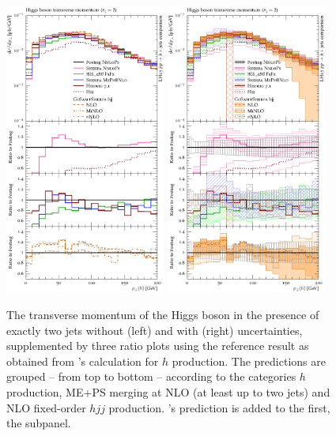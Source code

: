 \begin{figure}[t!]
  \centering
  \includegraphics[width=0.47\textwidth]{figures/hjetscomp_u_H_jj_pT_excl.pdf}
  \hfill
  \includegraphics[width=0.47\textwidth]{figures/hjetscomp_H_jj_pT_excl.pdf}
  \caption{\label{fig:hjetscomp:results:2obs:hpt_excl}%
    The transverse momentum of the Higgs boson in the presence of 
    exactly two jets without (left) and with (right) uncertainties,
    supplemented by three ratio plots using the reference result as
    obtained from \hjetscompPowheg's \hjetscompNNLOPS calculation for $h$ production.
    The predictions are grouped -- from top to bottom -- according to
    the categories \hjetscompNNLOPS $h$ production, ME+PS merging at NLO (at
    least up to two jets) and NLO fixed-order $hjj$ production. \hjetscompHej's
    prediction is added to the first, the \hjetscompNNLOPS subpanel.}
\end{figure}

